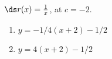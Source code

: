 {$\ds r(x) = \frac{1}{x}$, at $c=-2$.
}
{\begin{enumerate}
\item		$y = -1/4(x+2) - 1/2$
\item		$y = 4(x+2) - 1/2$
\end{enumerate}
}
